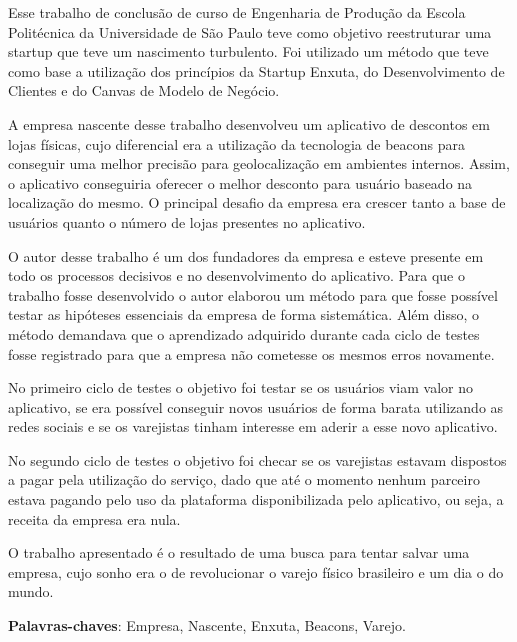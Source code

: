 \setlength{\absparsep}{18pt} %
\begin{resumo}
Esse trabalho de conclusão de curso de Engenharia de Produção da Escola Politécnica da Universidade de São Paulo teve como objetivo reestruturar uma startup que teve um nascimento turbulento. Foi utilizado um método que teve como base a utilização dos princípios da Startup Enxuta, do Desenvolvimento de Clientes e do Canvas de Modelo de Negócio.

A empresa nascente desse trabalho desenvolveu um aplicativo de descontos em lojas físicas, cujo diferencial era a utilização da tecnologia de beacons para conseguir uma melhor precisão para geolocalização em ambientes internos. Assim, o aplicativo conseguiria oferecer o melhor desconto para usuário baseado na localização do mesmo. O principal desafio da empresa era crescer tanto a base de usuários quanto o número de lojas presentes no aplicativo.

O autor desse trabalho é um dos fundadores da empresa e esteve presente em todo os processos decisivos e no desenvolvimento do aplicativo. Para que o trabalho fosse desenvolvido o autor elaborou um método para que fosse possível testar as hipóteses essenciais da empresa de forma sistemática. Além disso, o método demandava que o aprendizado adquirido durante cada ciclo de testes fosse registrado para que a empresa não cometesse os mesmos erros novamente.

No primeiro ciclo de testes o objetivo foi testar se os usuários viam valor no aplicativo, se era possível conseguir novos usuários de forma barata utilizando as redes sociais e se os varejistas tinham interesse em aderir a esse novo aplicativo.

No segundo ciclo de testes o objetivo foi checar se os varejistas estavam dispostos a pagar pela utilização do serviço, dado que até o momento nenhum parceiro estava pagando pelo uso da plataforma disponibilizada pelo aplicativo, ou seja, a receita da empresa era nula.

O trabalho apresentado é o resultado de uma busca para tentar salvar uma empresa, cujo sonho era o de revolucionar o varejo físico brasileiro e um dia o do mundo.

\textbf{Palavras-chaves}: Empresa, Nascente, Enxuta, Beacons, Varejo.
\end{resumo}